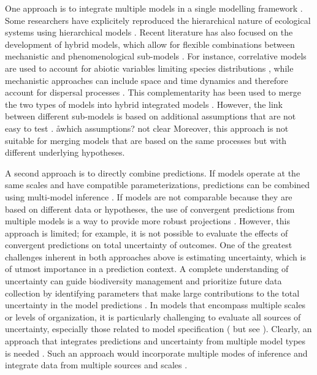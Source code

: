 One approach is to integrate multiple models in a single modelling framework \citep{Buckley2010}. 
Some researchers have explicitely reproduced the hierarchical nature of ecological systems using hierarchical models \citep[e.g.][]{Royale2008, Catterall2012, Strigul2012, Stewart-Koster2013, Soranno2014}. 
Recent literature has also focused on the development of hybrid models, which allow for flexible combinations between mechanistic and phenomenological sub-models \citep{Gallien2010, Franklin2010, Thuiller2013}. 
For instance, correlative models are used to account for abiotic variables limiting species distributions \citep{Guisan2005}, while mechanistic approaches can include space and time dynamics and therefore account for dispersal processes \citep{Kearney2008}. 
This complementarity has been used to merge the two types of models into hybrid integrated models \citep[e.g.][]{Keith2008, Anderson2009, Smolik2010, Boulangeat2014}. 
However, the link between different sub-models is based on additional assumptions that are not easy to test \citep{Gallien2010}. 
\aa{which assumptions? not clear}
Moreover, this approach is not suitable for merging models that are based on the same processes but with different underlying hypotheses.

A second approach is to directly combine predictions.
If models operate at the same scales and have compatible parameterizations, predictions can be combined using multi-model inference \citep[e.g., model averaging, ensemble forecasting;][]{Araujo2007, Diniz-Filho2009}. 
If models are not comparable because they are based on different data or hypotheses, the use of convergent predictions from multiple models is a way to provide more robust projections \citep{Morin2009, Marmion2009, Serra-Diaz2013}.
However, this approach is limited; for example, it is not possible to evaluate the effects of convergent predictions on total uncertainty of outcomes.
One of the greatest challenges inherent in both approaches above is estimating uncertainty, which is of utmost importance in a prediction context.
A complete understanding of uncertainty can guide biodiversity management and prioritize future data collection by identifying parameters that make large contributions to the total uncertainty in the model predictions \citep{McMahon2011}. 
In models that encompass multiple scales or levels of organization, it is particularly challenging to evaluate all sources of uncertainty, especially those related to model specification (\citealt{Calder2003} but see \citealt{Conlisk2013}).
Clearly, an approach that integrates predictions and uncertainty from multiple model types is needed \citep{Beck2012, Thuiller2013}. 
Such an approach would incorporate multiple modes of inference and integrate data from multiple sources and scales \citep{Levin1992, Peters2004, Thuiller2013}.

